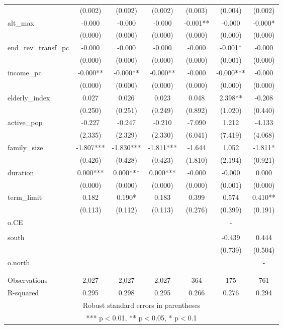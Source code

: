\documentclass[]{article}
\begin{document}
\begin{tabular}{lcccccc}
 & (0.002) & (0.002) & (0.002) & (0.003) & (0.004) & (0.002) \\
alt\_max & -0.000 & -0.000 & -0.000 & -0.001** & -0.000 & -0.000* \\
 & (0.000) & (0.000) & (0.000) & (0.000) & (0.000) & (0.000) \\
end\_rev\_transf\_pc & -0.000 & -0.000 & -0.000 & -0.000 & -0.001* & -0.000 \\
 & (0.000) & (0.000) & (0.000) & (0.000) & (0.001) & (0.000) \\
income\_pc & -0.000** & -0.000** & -0.000** & -0.000 & -0.000*** & -0.000 \\
 & (0.000) & (0.000) & (0.000) & (0.000) & (0.000) & (0.000) \\
elderly\_index & 0.027 & 0.026 & 0.023 & 0.048 & 2.398** & -0.208 \\
 & (0.250) & (0.251) & (0.249) & (0.892) & (1.020) & (0.440) \\
active\_pop & -0.227 & -0.247 & -0.210 & -7.090 & 1.212 & -4.133 \\
 & (2.335) & (2.329) & (2.330) & (6.041) & (7.419) & (4.068) \\
family\_size & -1.807*** & -1.830*** & -1.811*** & -1.644 & 1.052 & -1.811* \\
 & (0.426) & (0.428) & (0.423) & (1.810) & (2.194) & (0.921) \\
duration & 0.000*** & 0.000*** & 0.000*** & -0.000 & -0.000 & 0.000 \\
 & (0.000) & (0.000) & (0.000) & (0.000) & (0.001) & (0.000) \\
term\_limit & 0.182 & 0.190* & 0.183 & 0.399 & 0.574 & 0.410** \\
 & (0.113) & (0.112) & (0.113) & (0.276) & (0.399) & (0.191) \\
o.CE &  &  &  &  & - &  \\
 &  &  &  &  &  &  \\
south &  &  &  &  & -0.439 & 0.444 \\
 &  &  &  &  & (0.739) & (0.504) \\
o.north &  &  &  &  &  & - \\
 &  &  &  &  &  &  \\
 &  &  &  &  &  &  \\
Observations & 2,027 & 2,027 & 2,027 & 364 & 175 & 761 \\
 R-squared & 0.295 & 0.298 & 0.295 & 0.266 & 0.276 & 0.294 \\ \hline
\multicolumn{7}{c}{ Robust standard errors in parentheses} \\
\multicolumn{7}{c}{ *** p$<$0.01, ** p$<$0.05, * p$<$0.1} \\
\end{tabular}
\end{document}
